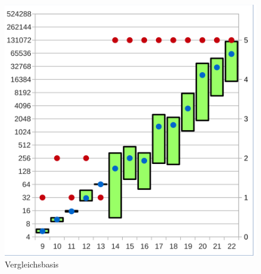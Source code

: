 \begin{figure}[!h]
\begin{minipage}[t]{0.45\textwidth}
  \includegraphics[scale=0.55]{images/data_base_xor}
  \end{minipage}
  \caption{Vergleichsbasis}
  \label{fig:data_base}
\end{figure}






